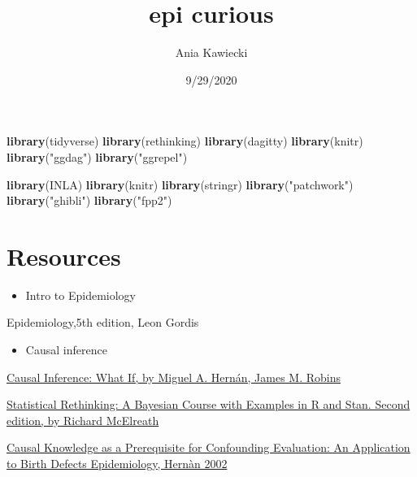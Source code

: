 \documentclass[
]{article}
\title{epi curious}
\author{Ania Kawiecki}
\date{9/29/2020}
\newenvironment{Shaded}{\begin{snugshade}}{\end{snugshade}}
\newcommand{\KeywordTok}[1]{\textcolor[rgb]{0.13,0.29,0.53}{\textbf{#1}}}
\newcommand{\NormalTok}[1]{#1}
\newcommand{\StringTok}[1]{\textcolor[rgb]{0.31,0.60,0.02}{#1}}
\providecommand{\tightlist}{%
  \setlength{\itemsep}{0pt}\setlength{\parskip}{0pt}}
\begin{document}
\maketitle

{
\setcounter{tocdepth}{2}
\tableofcontents
}
\begin{Shaded}
\begin{Highlighting}[]
\KeywordTok{library}\NormalTok{(tidyverse)}
\KeywordTok{library}\NormalTok{(rethinking)}
\KeywordTok{library}\NormalTok{(dagitty)}
\KeywordTok{library}\NormalTok{(knitr)}
\KeywordTok{library}\NormalTok{(}\StringTok{"ggdag"}\NormalTok{)}
\KeywordTok{library}\NormalTok{(}\StringTok{"ggrepel"}\NormalTok{)}

\KeywordTok{library}\NormalTok{(INLA)}
\KeywordTok{library}\NormalTok{(knitr)}
\KeywordTok{library}\NormalTok{(stringr)}
\KeywordTok{library}\NormalTok{(}\StringTok{"patchwork"}\NormalTok{)}
\KeywordTok{library}\NormalTok{(}\StringTok{"ghibli"}\NormalTok{)}
\KeywordTok{library}\NormalTok{(}\StringTok{"fpp2"}\NormalTok{)}
\end{Highlighting}
\end{Shaded}

\hypertarget{resources}{%
\section{Resources}\label{resources}}

\begin{itemize}
\tightlist
\item
  Intro to Epidemiology
\end{itemize}

Epidemiology,5th edition, Leon Gordis

\begin{itemize}
\tightlist
\item
  Causal inference
\end{itemize}

\href{https://www.hsph.harvard.edu/miguel-hernan/causal-inference-book/}{Causal
Inference: What If, by Miguel A. Hernán, James M. Robins}

\href{http://xcelab.net/rm/statistical-rethinking/}{Statistical
Rethinking: A Bayesian Course with Examples in R and Stan. Second
edition, by Richard McElreath}

\href{https://academic.oup.com/aje/article/155/2/176/108106}{Causal
Knowledge as a Prerequisite for Confounding Evaluation: An Application
to Birth Defects Epidemiology, Hernàn 2002}
\end{document}
